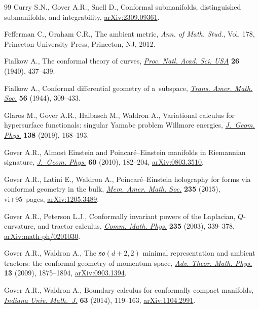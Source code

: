 \documentclass[10pt,a4paper]{article}
\numberwithin{equation}{section}
\renewcommand{\=}{\stackrel \Lambda =}
\begin{document}
\begin{thebibliography}{99}
Curry S.N., Gover A.R., Snell D., Conformal submanifolds, distinguished
 submanifolds, and integrability, \href{https://arxiv.org/abs/2309.09361}{arXiv:2309.09361}.

Fefferman C., Graham C.R., The ambient metric, \textit{Ann. of Math. Stud.},
 Vol. 178, Princeton University Press, Princeton, NJ, 2012.

Fialkow A., The conformal theory of curves, \href{https://doi.org/10.1073/pnas.26.6.437}{\textit{Proc. Natl. Acad. Sci. USA}}
 \textbf{26} (1940), 437--439.

Fialkow A., Conformal differential geometry of a~subspace, \href{https://doi.org/10.2307/1990251}{\textit{Trans. Amer.
 Math. Soc.}} \textbf{56} (1944), 309--433.

Glaros M., Gover A.R., Halbasch M., Waldron A., Variational calculus for
 hypersurface functionals: singular {Y}amabe problem {W}illmore energies,
 \href{https://doi.org/10.1016/j.geomphys.2018.12.018}{\textit{J.~Geom. Phys.}} \textbf{138} (2019), 168--193.

Gover A.R., Almost {E}instein and {P}oincar\'e--{E}instein manifolds in
 {R}iemannian signature, \href{https://doi.org/10.1016/j.geomphys.2009.09.016}{\textit{J.~Geom. Phys.}} \textbf{60} (2010), 182--204,
 \href{https://arxiv.org/abs/0803.3510}{arXiv:0803.3510}.

Gover A.R., Latini E., Waldron A., {P}oincar\'e--{E}instein holography for
 forms via conformal geometry in the bulk, \href{https://doi.org/10.1090/memo/1106}{\textit{Mem. Amer. Math. Soc.}}
 \textbf{235} (2015), vi+95~pages, \href{https://arxiv.org/abs/1205.3489}{arXiv:1205.3489}.

Gover A.R., Peterson L.J., Conformally invariant powers of the {L}aplacian,
 {$Q$}-curvature, and tractor calculus, \href{https://doi.org/10.1007/s00220-002-0790-4}{\textit{Comm. Math. Phys.}}
 \textbf{235} (2003), 339--378, \href{https://arxiv.org/abs/math-ph/0201030}{arXiv:math-ph/0201030}.

Gover A.R., Waldron A., The {$\mathfrak{so}(d+2,2)$} minimal representation and
 ambient tractors: the conformal geometry of momentum space, \href{https://doi.org/10.4310/atmp.2009.v13.n6.a7}{\textit{Adv.
 Theor. Math. Phys.}} \textbf{13} (2009), 1875--1894, \href{https://arxiv.org/abs/0903.1394}{arXiv:0903.1394}.

Gover A.R., Waldron A., Boundary calculus for conformally compact manifolds,
 \href{https://doi.org/10.1512/iumj.2014.63.5057}{\textit{Indiana Univ. Math.~J.}} \textbf{63} (2014), 119--163,
 \href{https://arxiv.org/abs/1104.2991}{arXiv:1104.2991}.


\end{thebibliography}
\end{document}
